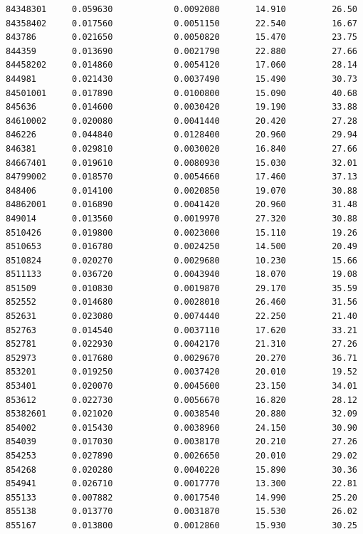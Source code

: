 \documentclass[
  letterpaper,
  DIV=11,
  numbers=noendperiod]{scrartcl}
\begin{document}
\begin{verbatim}
84348301     0.059630            0.0092080       14.910         26.50
84358402     0.017560            0.0051150       22.540         16.67
843786       0.021650            0.0050820       15.470         23.75
844359       0.013690            0.0021790       22.880         27.66
84458202     0.014860            0.0054120       17.060         28.14
844981       0.021430            0.0037490       15.490         30.73
84501001     0.017890            0.0100800       15.090         40.68
845636       0.014600            0.0030420       19.190         33.88
84610002     0.020080            0.0041440       20.420         27.28
846226       0.044840            0.0128400       20.960         29.94
846381       0.029810            0.0030020       16.840         27.66
84667401     0.019610            0.0080930       15.030         32.01
84799002     0.018570            0.0054660       17.460         37.13
848406       0.014100            0.0020850       19.070         30.88
84862001     0.016890            0.0041420       20.960         31.48
849014       0.013560            0.0019970       27.320         30.88
8510426      0.019800            0.0023000       15.110         19.26
8510653      0.016780            0.0024250       14.500         20.49
8510824      0.020270            0.0029680       10.230         15.66
8511133      0.036720            0.0043940       18.070         19.08
851509       0.010830            0.0019870       29.170         35.59
852552       0.014680            0.0028010       26.460         31.56
852631       0.023080            0.0074440       22.250         21.40
852763       0.014540            0.0037110       17.620         33.21
852781       0.022930            0.0042170       21.310         27.26
852973       0.017680            0.0029670       20.270         36.71
853201       0.019250            0.0037420       20.010         19.52
853401       0.020070            0.0045600       23.150         34.01
853612       0.022730            0.0056670       16.820         28.12
85382601     0.021020            0.0038540       20.880         32.09
854002       0.015430            0.0038960       24.150         30.90
854039       0.017030            0.0038170       20.210         27.26
854253       0.027890            0.0026650       20.010         29.02
854268       0.020280            0.0040220       15.890         30.36
854941       0.026710            0.0017770       13.300         22.81
855133       0.007882            0.0017540       14.990         25.20
855138       0.013770            0.0031870       15.530         26.02
855167       0.013800            0.0012860       15.930         30.25

\end{verbatim}
\end{document}
